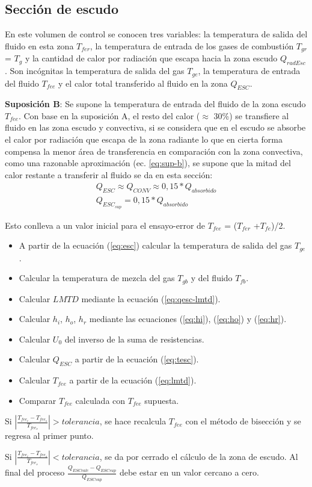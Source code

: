 \subsection{Sección de escudo}
\par En este volumen de control se conocen tres variables: la temperatura de salida del fluido en esta zona $T_{fer}$, la temperatura de entrada de los gases de combustión $T_{gr}$ = $T_g$ y la cantidad de calor por radiación que escapa hacia la zona escudo $Q_{radEsc}$. Son incógnitas la temperatura de salida del gas $T_{ge}$, la temperatura de entrada del fluido $T_{fee}$ y el calor total transferido al fluido en la zona $Q_{ESC}$.
\par \textbf{Suposición B}: Se supone la temperatura de entrada del fluido de la zona escudo $T_{fee}$. Con base en la suposición A, el resto del calor ($\approx$ 30\%) se transfiere al fluido en las zona escudo y convectiva, si se considera que en el escudo se absorbe el calor por radiación que escapa de la zona radiante lo que en cierta forma compensa la menor área de transferencia en comparación con la zona convectiva, como una razonable aproximación (ec. \ref{eq:sup-b}), se supone que la mitad del calor restante a transferir al fluido se da en esta sección:
\begin{equation}\label{eq:sup-b}\begin{gathered}
    Q_{ESC} \approx Q_{CONV} \approx 0,15 * Q_{absorbido}\\
    Q_{ESC_{sup}} = 0,15 * Q_{absorbido} 
\end{gathered}\end{equation}
\par Esto conlleva a un valor inicial para el ensayo-error de $T_{fee}$ = ($T_{fer}$ +$T_{fe}$)/2. 
\begin{itemize}
    \item A partir de la ecuación (\ref{eq:esc}) calcular la temperatura de salida del gas $T_{ge}$.
    \item Calcular la temperatura de mezcla del gas $T_{gb}$ y del fluido $T_{fb}$.
    \item Calcular $LMTD$ mediante la ecuación (\ref{eq:qesc-lmtd}).
    \item Calcular $h_i$, $h_o$, $h_r$ mediante las ecuaciones (\ref{eq:hi}), (\ref{eq:ho}) y (\ref{eq:hr}).
    \item Calcular $U_0$ del inverso de la suma de resistencias.
    \item Calcular $Q_{ESC}$ a partir de la ecuación (\ref{eq:tesc}).
    \item Calcular $T_{fee}$ a partir de la ecuación (\ref{eq:lmtd}).
    \item Comparar $T_{fee}$ calculada con $T_{fee}$ supuesta.
\end{itemize}
\par Si $|\frac{T_{fee_c} - T_{fee_s}}{T_{fee_s}}| > tolerancia$, se hace recalcula $T_{fee}$ con el método de bisección y se regresa al primer punto.
\par Si $|\frac{T_{fee_c} - T_{fee_s}}{T_{fee_s}} | < tolerancia$, se da por cerrado el cálculo de la zona de escudo. Al final del proceso $\frac{Q_{ESCcalc} - Q_{ESCsup}}{ Q_{ESCsup}}$ debe estar en un valor cercano a cero.

